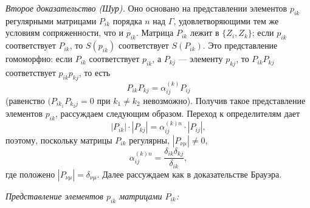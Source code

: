 \documentclass[11pt]{article}
\begin{document}
\emph{Второе доказательство (Шур).} Оно основано на представлении элементов \(p_{ik}\) регулярными матрицами \(P_{ik}\) порядка \(n\) над \(\Gamma\), удовлетворяющими тем же условиям сопряженности, что и \(p_{ik}\). Матрица \(P_{ik}\) лежит в \(\{Z_i,Z_k\}\); если \(p_{ik}\) соответствует \(P_{ik}\), то \(S(p_{ik})\) соответствует \(S(P_{ik})\). Это представление гомоморфно: если \(P_{ik}\) соответствует \(p_{ik}\), а \(P_{kj}\) --- элементу \(p_{kj}\), то \(P_{ik}P_{kj}\) соответствует \(p_{ik}p_{kj}\), то есть
\[
P_{ik}P_{kj}=\alpha_{ij}^{(k)}P_{ij}
\]
(равенство \((P_{ik_1}P_{k_2j}=0\) при \(k_1\neq k_2\) невозможно). Получив такое представление элементов \(p_{ik}\), рассуждаем следующим образом. Переход к определителям дает
\[
|P_{ik}|\cdot |P_{kj}|=\alpha_{ij}^{(k)n}\cdot |P_{ij}|,
\]
поэтому, поскольку матрицы \(P_{ik}\) регулярны, \(|P_{\nu\mu}|\ne0\),
\[
\alpha_{ij}^{(k)n}=\frac{\delta_{ik}\delta_{kj}}{\delta_{ik}},
\]
где положено \(|P_{\nu\mu}|=\delta_{\nu\mu}\). Далее рассуждаем как в доказательстве Брауэра.

\emph{Представление элементов \(p_{ik}\) матрицами \(P_{ik}\):}
\end{document}
